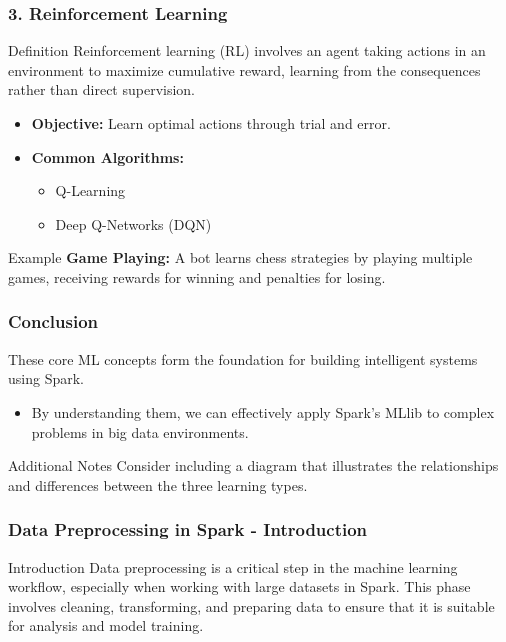 \documentclass[aspectratio=169]{beamer}
\begin{document}
\begin{frame}[fragile]
    \frametitle{3. Reinforcement Learning}
    \begin{block}{Definition}
        Reinforcement learning (RL) involves an agent taking actions in an environment to maximize cumulative reward, learning from the consequences rather than direct supervision.
    \end{block}
    
    \begin{itemize}
        \item \textbf{Objective:} Learn optimal actions through trial and error.
        \item \textbf{Common Algorithms:} 
            \begin{itemize}
                \item Q-Learning
                \item Deep Q-Networks (DQN)
            \end{itemize}
    \end{itemize}
    
    \begin{block}{Example}
        \textbf{Game Playing:} 
        A bot learns chess strategies by playing multiple games, receiving rewards for winning and penalties for losing. 
    \end{block}
\end{frame}

\begin{frame}[fragile]
    \frametitle{Conclusion}
    These core ML concepts form the foundation for building intelligent systems using Spark. 
    \begin{itemize}
        \item By understanding them, we can effectively apply Spark's MLlib to complex problems in big data environments.
    \end{itemize}
    \begin{block}{Additional Notes}
        Consider including a diagram that illustrates the relationships and differences between the three learning types.
    \end{block}
\end{frame}

\begin{frame}[fragile]
    \frametitle{Data Preprocessing in Spark - Introduction}
    \begin{block}{Introduction}
        Data preprocessing is a critical step in the machine learning workflow, especially when working with large datasets in Spark. This phase involves cleaning, transforming, and preparing data to ensure that it is suitable for analysis and model training.
    \end{block}
\end{frame}
\end{document}
